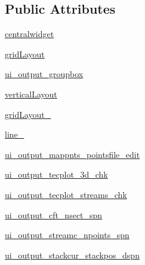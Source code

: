 \subsection*{Public Attributes}
\begin{DoxyCompactItemize}
\item 
\hyperlink{classbladepro__modules_1_1inputfile__writer_u_i_1_1_ui___main_window_a99bcc614e5be2356b9b0e54f30bb009e}{centralwidget}
\item 
\hyperlink{classbladepro__modules_1_1inputfile__writer_u_i_1_1_ui___main_window_aad085c53319e511b5f37895a71336716}{grid\+Layout}
\item 
\hyperlink{classbladepro__modules_1_1inputfile__writer_u_i_1_1_ui___main_window_a342c5c54417df97a32a10f28fe93d81e}{ui\+\_\+output\+\_\+groupbox}
\item 
\hyperlink{classbladepro__modules_1_1inputfile__writer_u_i_1_1_ui___main_window_ae33ea0222b6e62c39a7081946f32072a}{vertical\+Layout}
\item 
\hyperlink{classbladepro__modules_1_1inputfile__writer_u_i_1_1_ui___main_window_ad528f27c7c549b388b9a6dc2e24f9880}{grid\+Layout\+\_}
\item 
\hyperlink{classbladepro__modules_1_1inputfile__writer_u_i_1_1_ui___main_window_a55227446d0a73588ace14f77945ec2ee}{line\+\_}
\item 
\hyperlink{classbladepro__modules_1_1inputfile__writer_u_i_1_1_ui___main_window_a8020c73e1cf12f6c112a79f2c34af062}{ui\+\_\+output\+\_\+mappnts\+\_\+pointsfile\+\_\+edit}
\item 
\hyperlink{classbladepro__modules_1_1inputfile__writer_u_i_1_1_ui___main_window_a47635280e1268bda03a8e1f69a03fc35}{ui\+\_\+output\+\_\+tecplot\+\_\+3d\+\_\+chk}
\item 
\hyperlink{classbladepro__modules_1_1inputfile__writer_u_i_1_1_ui___main_window_a08c1ff077d7bec4a77e7f540b681c71a}{ui\+\_\+output\+\_\+tecplot\+\_\+streams\+\_\+chk}
\item 
\hyperlink{classbladepro__modules_1_1inputfile__writer_u_i_1_1_ui___main_window_a7689384c6c651ee544d44f0029a731b5}{ui\+\_\+output\+\_\+cft\+\_\+nsect\+\_\+spn}
\item 
\hyperlink{classbladepro__modules_1_1inputfile__writer_u_i_1_1_ui___main_window_a7376266aa4a7bdb95b74e14c4e2294c0}{ui\+\_\+output\+\_\+streamc\+\_\+npoints\+\_\+spn}
\item 
\hyperlink{classbladepro__modules_1_1inputfile__writer_u_i_1_1_ui___main_window_a51d1efb48954a11443baee2265fb4a2a}{ui\+\_\+output\+\_\+stackcur\+\_\+stackpos\+\_\+dspn}

\end{DoxyCompactItemize}
